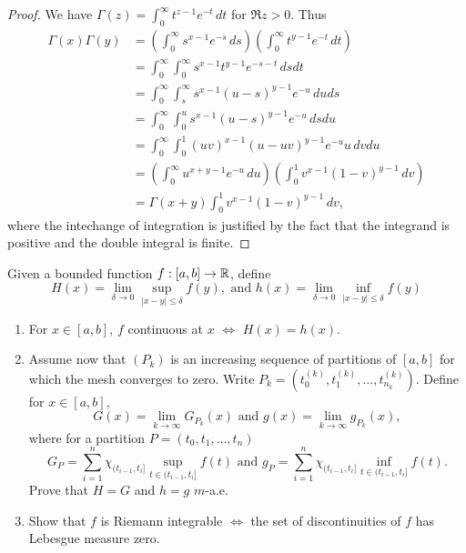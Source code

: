 \documentclass{article}
\begin{document}
\begin{proof}
We have $\Gamma(z) = \int_0^\infty t^{z - 1} e^{-t} \, dt$ for $\Re z > 0$.  Thus
\begin{align*}
\Gamma(x) \Gamma(y)  & = \left(\int_0^\infty s^{x - 1} e^{-s} \, ds \right) \left( \int_0^\infty t^{y - 1} e^{-t} \, dt \right)
\\ & = \int_0^ \infty \int_0^\infty s^{x - 1} t^{y-1} e^{-s - t} \, ds dt
\\ & = \int_0^\infty \int_s^\infty s^{x - 1} (u - s)^{y-1} e^{-u} \, du ds
\\ & = \int_0^\infty \int_0^u s^{x - 1} (u - s)^{y-1} e^{-u} \,  ds du
\\ & = \int_0^\infty \int_0^1 (uv)^{x - 1} (u - uv)^{y-1} e^{-u} u \, dv du
\\ & = \left( \int_0^\infty u^{x + y -1 } e^{-u} \,  du \right) \left( \int_0^1 v^{x - 1} (1 - v)^{y-1}  \, dv \right)
\\ & = \Gamma(x + y) \int_0^1 v^{x - 1} (1 - v)^{y-1}  \, dv,
\end{align*}
where the intechange of integration is justified by the fact that the integrand is positive and the double integral is finite.
\end{proof}

 Given a bounded function $f : [a,b] \to \mathbb{R}$, define
$$ H(x) = \lim_{\delta \to 0} \sup_{|x - y| \le \delta} f(y), \text{ and } h(x) = \lim_{\delta \to 0} \inf_{|x - y| \le \delta} f(y)$$
\begin{enumerate}[\bfseries a)]
\item For $x \in [a,b]$, $f$ continuous at $x$ $\iff$ $H(x) = h(x)$.
\item Assume now that $(P_k)$ is an increasing sequence of partitions of $[a,b]$ for which the mesh converges to zero. Write $P_k = (t_0^{(k)}, t_1^{(k)}, \ldots, t_{n_k}^{(k)})$. Define for $x \in [a,b]$,
$$G(x) = \lim_{k \to \infty} G_{P_k}(x) \text{ and } g(x) = \lim_{k \to \infty} g_{P_k}(x),$$
where for a partition $P = (t_0, t_1, \ldots, t_n)$
$$G_P = \sum_{i=1}^n \chi_{(t_{i-1}, t_i]} \sup_{t \in (t_{i-1}, t_i]} f(t) \text{ and } g_P = \sum_{i=1}^n \chi_{(t_{i-1}, t_i]} \inf_{t \in (t_{i-1}, t_i]} f(t).$$
Prove that $H = G$ and $h = g$ $m$-a.e.
\item Show that $f$ is Riemann integrable $\iff$ the set of discontinuities of $f$ has Lebesgue measure zero.
\end{enumerate}
\end{document}
